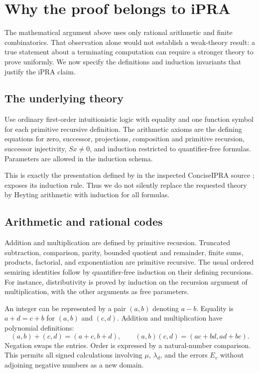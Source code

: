 \section{Why the proof belongs to iPRA}
\label{sec:ipra}

The mathematical argument above uses only rational arithmetic and finite
combinatorics. That observation alone would not establish a weak-theory
result: a true statement about a terminating computation can require a
stronger theory to prove uniformly. We now specify the definitions and
induction invariants that justify the iPRA claim.

\subsection{The underlying theory}

Use ordinary first-order intuitionistic logic with equality and one
function symbol for each primitive recursive definition. The arithmetic
axioms are the defining equations for zero, successor, projections,
composition and primitive recursion, successor injectivity,
\(Sx\ne0\), and induction restricted to quantifier-free formulas.
Parameters are allowed in the induction schema.

This is exactly the presentation defined by  in the inspected
ConciseIPRA source \cite{proveit};  exposes its induction
rule. Thus we do not silently replace the requested theory by Heyting
arithmetic with induction for all formulas.

\subsection{Arithmetic and rational codes}

Addition and multiplication are defined by primitive recursion.
Truncated subtraction, comparison, parity, bounded quotient and remainder,
finite sums, products, factorial, and exponentiation are primitive recursive.
The usual ordered semiring identities follow by quantifier-free induction
on their defining recursions. For instance, distributivity is proved by
induction on the recursion argument of multiplication, with the other
arguments as free parameters.

An integer can be represented by a pair \((a,b)\) denoting \(a-b\).
Equality is \(a+d=c+b\) for \((a,b)\) and \((c,d)\).
Addition and multiplication have polynomial definitions:
\[
 (a,b)+(c,d)=(a+c,b+d),\qquad
 (a,b)(c,d)=(ac+bd,ad+bc).
\]
Negation swaps the entries. Order is expressed by a natural-number
comparison. This permits all signed calculations involving \(\mu\),
\(\lambda_d\), and the errors \(E_v\) without adjoining negative numbers
as a new domain.

